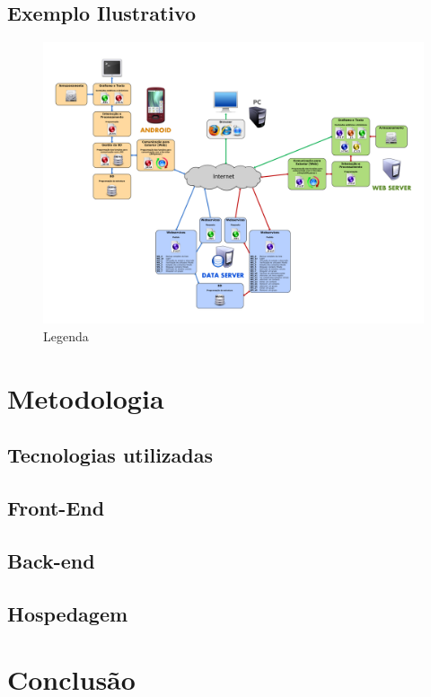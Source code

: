 \documentclass[12pt]{article}
\begin{document}
\subsection{Exemplo Ilustrativo}
\begin{figure}[H]
	\centering
	\includegraphics[scale=0.18]{Imagens/webservice.png}
	\caption{Legenda}
	\label{wbs}
\end{figure}
\section{Metodologia}
	\subsection{Tecnologias utilizadas}
	\subsection{Front-End}
	\subsection{Back-end}
	\subsection{Hospedagem}
\section{Conclusão}

 
\end{document}
